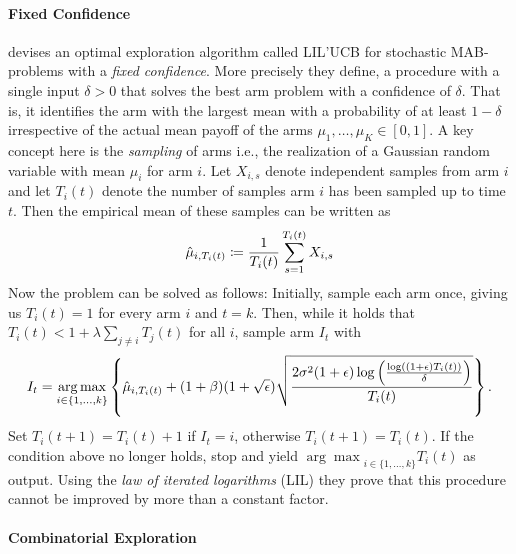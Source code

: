\paragraph{Fixed Confidence}
\cite{jamieson2014lil} devises an optimal exploration algorithm called LIL'UCB for stochastic MAB-problems with a \textit{fixed confidence}. More precisely they define, a procedure with a single input $\delta > 0$ that solves the best arm problem with a confidence of $\delta$. That is, it identifies the arm with the largest mean with a probability of at least $1-\delta$ irrespective of the actual mean payoff of the arms $\mu_1,\ldots,\mu_K \in [0,1]$. A key concept here is the \textit{sampling} of arms i.e., the realization of a Gaussian random variable with mean $\mu_i$ for arm $i$. Let $X_{i,s}$ denote independent samples from arm $i$ and let $T_i(t)$ denote the number of samples arm $i$ has been sampled up to time $t$. Then the empirical mean of these samples can be written as
\begin{equation*}
    \Hat{\mu}_{i,T_i(t)} \coloneqq \frac{1}{T_i(t)}\sum_{s=1}^{T_i(t)} X_{i,s}
\end{equation*}
Now the problem can be solved as follows: Initially, sample each arm once, giving us $T_i(t) = 1$ for every arm $i$ and $t = k$. Then, while it holds that $T_i(t) < 1 + \lambda \sum_{j\neq i} T_j(t)$ for all $i$, sample arm $I_t$ with
\begin{equation*}
    I_t = \underset{i \in \{1,\ldots,k\}}{\arg \max} \left\{ \Hat{\mu}_{i,T_i(t)} + (1+\beta)(1+\sqrt{\epsilon}) \sqrt{\frac{2\sigma^2 (1+\epsilon) \log \left(\frac{\log((1+\epsilon)T_i(t))}{\delta}\right)}{T_i(t)}}\right\}\text{.}
\end{equation*}
Set $T_i(t+1) = T_i(t) + 1$ if $I_t = i$, otherwise $T_i(t+1) = T_i(t)$. If the condition above no longer holds, stop and yield ${\arg \max}_{i \in \{ 1,\ldots,k\}} T_i(t)$ as output. Using the \textit{law of iterated logarithms} (LIL) they prove that this procedure cannot be improved by more than a constant factor.  
\paragraph{Combinatorial Exploration} \cite{chen2014combinatorial}
